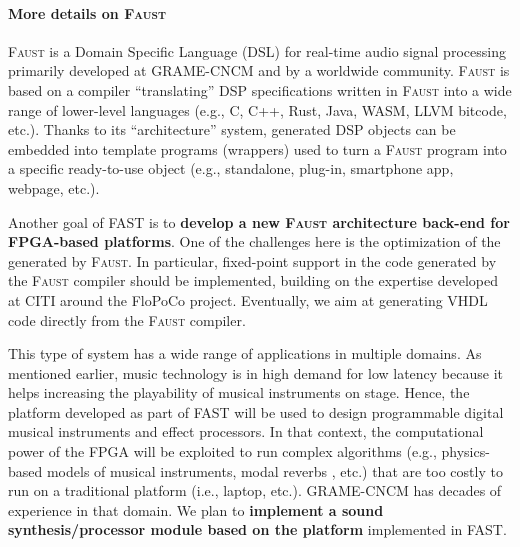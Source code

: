 \documentclass[a4paper,10pt]{article}
\newcommand{\F}{\textsc{Faust}}
\newcommand{\PP}{FAST}
\begin{document}
\paragraph{More details on \F{}}
\F{} \cite{Orlarey2009} is a Domain Specific Language (DSL) for real-time audio signal processing primarily developed at GRAME-CNCM and by a worldwide community. \F{} is based on a compiler ``translating'' DSP specifications written in \F{} into a wide range of lower-level languages (e.g., C, C++, Rust, Java, WASM, LLVM bitcode, etc.). Thanks to its ``architecture'' system, generated DSP objects can be embedded into template programs (wrappers) used to turn a \F{} program into a specific ready-to-use object (e.g., standalone, plug-in, smartphone app, webpage, etc.). 


Another goal of \PP{} is to \textbf{develop a new \F{} architecture back-end for FPGA-based platforms}.
One of the challenges here is the  optimization of the  generated by \F{}. In particular, fixed-point support in the code generated by the \F{} compiler should be implemented, building on the expertise developed at CITI around the FloPoCo project. Eventually, we aim at generating VHDL code directly from the \F{} compiler. 

This type of system has a wide range of applications in multiple domains. As mentioned earlier, music technology is in high demand for low latency because it helps increasing the playability of musical instruments on stage. Hence, the platform developed as part of \PP{} will be used to design programmable digital musical instruments and effect processors. In that context, the computational power of the FPGA will be exploited to run complex algorithms (e.g., physics-based models of musical instruments, modal reverbs \cite{Abel2009}, etc.) that are too costly to run on a traditional platform (i.e., laptop, etc.). GRAME-CNCM has decades of experience in that domain. We plan to \textbf{implement a sound synthesis/processor module based on the platform} implemented in \PP{}.
\end{document}
